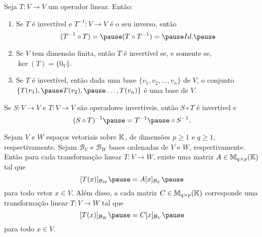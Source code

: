 \documentclass{beamer}
\begin{document}
\begin{frame}
    \begin{proposicao}
        Seja $T \colon V \to V$ um operador linear. \pause Então:
        \begin{enumerate}[label={\roman*})]
            \item Se $T$ é invertível \pause e $T^{-1} \colon V \to V$ é o seu inverso, \pause então
                \[
                    (T^{-1} \circ T) = \pause (T \circ T^{-1}) = \pause Id.\pause
                \]

            \vspace{.5cm}

            \item Se $V$ tem dimensão finita, \pause então $T$ é invertível \pause se, e somente se, \pause $\ker(T) = \{0_V\}$.\pause

            \vspace{.5cm}

            \item Se $T$ é invertível, \pause então dada uma base $\{v_1, v_2, \dots, v_n\}$ de $V$, \pause o conjunto $\{T(v_1), \pause
                T(v_2), \pause \dots, T(v_n)\}$ \pause é uma base de $V$.
        \end{enumerate}
    \end{proposicao}
\end{frame}

\begin{frame}
    \begin{proposicao}
        Se $S \colon V \to V$ e $T \colon V \to V$ \pause são operadores invertíveis, \pause então $S \circ T$ é invertível e\pause
        \[
            (S \circ T)^{-1} \pause = T^{-1} \pause \circ S^{-1}.
        \]
    \end{proposicao}
\end{frame}

\begin{frame}
    \begin{teorema}
        Sejam $V$ e $W$ espaços vetoriais sobre $\mathbb{K}$, \pause de dimensões $p \ge 1$ e $q \ge 1$, respectivamente. \pause Sejam
        $\mathcal{B}_V$ e $\mathcal{B}_W$ bases ordenadas de $V$ e $W$, respectivamente. \pause Então para cada transformação linear
        $T \colon V \to W$, \pause existe uma matriz $A \in \mathbb{M}_{q\times p}(\mathbb{K})$ tal que\pause
        \[
            [T(x)]_{\mathcal{B}_W} \pause = A[x]_{\mathcal{B}_V}\pause
        \]
        para todo vetor $x \in V$. \pause Além disso, \pause a cada matriz $C \in \mathbb{M}_{q\times p}(\mathbb{K})$ \pause corresponde uma
        transformação linear $T \colon V \to W$ tal que\pause
        \[
            [T(x)]_{\mathcal{B}_W} \pause = C[x]_{\mathcal{B}_V}\pause
        \]
        para todo $x \in V$.
    \end{teorema}
\end{frame}
\end{document}
